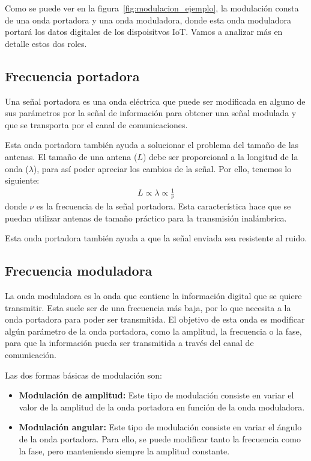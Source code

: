 \documentclass[12pt, letterpaper]{article}
\begin{document}
Como se puede ver en la figura~\ref{fig:modulacion_ejemplo}, la modulación consta de una onda portadora y una onda moduladora, donde esta onda moduladora portará los datos digitales de los dispoisitvos IoT. Vamos a analizar más en detalle estos dos roles.

\subsection{Frecuencia portadora}
Una señal portadora es una onda eléctrica que puede ser modificada en alguno de sus parámetros por la señal de información para obtener una señal modulada y que se transporta por el canal de comunicaciones. 

Esta onda portadora también ayuda a solucionar el problema del tamaño de las antenas. El tamaño de una antena ($L$) debe ser proporcional a la longitud de la onda ($\lambda$), para así poder apreciar los cambios de la señal. Por ello, tenemos lo siguiente:
\begin{align}
    L \propto \lambda \propto \frac{1}{\nu}
\end{align}
donde $\nu$ es la frecuencia de la señal portadora. Esta característica hace que se puedan utilizar antenas de tamaño práctico para la transmisión inalámbrica.

Esta onda portadora también ayuda a que la señal enviada sea resistente al ruido.

\subsection{Frecuencia moduladora}
La onda moduladora es la onda que contiene la información digital que se quiere transmitir. Esta suele ser de una frecuencia más baja, por lo que necesita a la onda portadora para poder ser transmitida. El objetivo de esta onda es modificar algún parámetro de la onda portadora, como la amplitud, la frecuencia o la fase, para que la información pueda ser transmitida a través del canal de comunicación.

Las dos formas básicas de modulación son:
\begin{itemize}
    \item \textbf{Modulación de amplitud:} Este tipo de modulación consiste en variar el valor de la amplitud de la onda portadora en función de la onda moduladora. 

    \item \textbf{Modulación angular:} Este tipo de modulación consiste en variar el ángulo de la onda portadora. Para ello, se puede modificar tanto la frecuencia como la fase, pero manteniendo siempre la amplitud constante.
\end{itemize}
\end{document}
